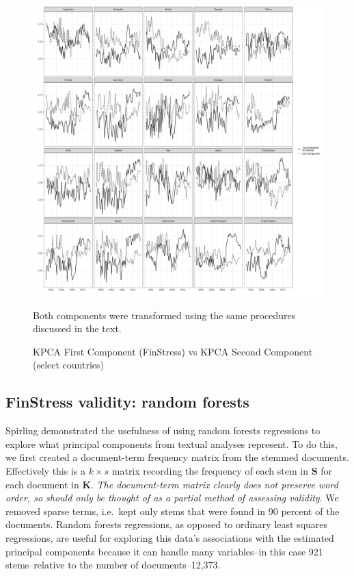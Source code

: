 \documentclass[]{article}
\begin{document}
\begin{figure}
	\caption{KPCA First Component (FinStress) vs KPCA Second Component (select countries)}
	\label{c1c2}
    \begin{center}
    	\includegraphics[scale=0.45]{figures/1st_vs_2nd_component_selected.pdf}
    \end{center}
    {\scriptsize{Both components were transformed using the same procedures discussed in the text.}}

\end{figure}

\subsection*{FinStress validity: random forests}\label{random-forests}

Spirling \citeyearpar[88-90]{Spirling2012} demonstrated the usefulness of using random forests regressions \citep{Breiman2001,jones2015} to explore what principal components from textual analyses represent. To do this, we first created a document-term frequency matrix from the stemmed documents. Effectively this is a \(k \times s\) matrix recording the frequency of each stem in \(\bm{S}\) for each document in \(\bm{K}\). \emph{The document-term matrix clearly does not preserve word order, so should only be thought of as a partial method of assessing validity}. We removed sparse terms, i.e.~kept only stems that were found in 90 percent of the documents. Random forests regressions, as opposed to ordinary least squares regressions, are useful for exploring this data's associations with the estimated principal components because it can handle many variables--in this case 921 stems--relative to the number of documents--12,373.
\end{document}
